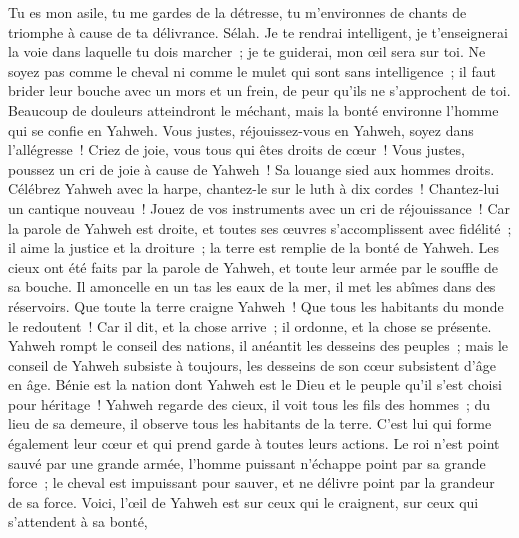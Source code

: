 \begin{multicols}{2}
Tu es mon asile, tu me gardes de la détresse, tu m'environnes de chants de triomphe à cause de ta délivrance. Sélah.
Je te rendrai intelligent, je t'enseignerai la voie dans laquelle tu dois marcher~; je te guiderai, mon œil sera sur toi.
Ne soyez pas comme le cheval ni comme le mulet qui sont sans intelligence~; il faut brider leur bouche avec un mors et un frein, de peur qu'ils ne s'approchent de toi.
Beaucoup de douleurs atteindront le méchant, mais la bonté environne l'homme qui se confie en Yahweh.
Vous justes, réjouissez-vous en Yahweh, soyez dans l'allégresse~! Criez de joie, vous tous qui êtes droits de cœur~!
\VerseOne{}Vous justes, poussez un cri de joie à cause de Yahweh~! Sa louange sied aux hommes droits.
Célébrez Yahweh avec la harpe, chantez-le sur le luth à dix cordes~!
Chantez-lui un cantique nouveau~! Jouez de vos instruments avec un cri de réjouissance~!
Car la parole de Yahweh est droite, et toutes ses œuvres s'accomplissent avec fidélité~;
il aime la justice et la droiture~; la terre est remplie de la bonté de Yahweh.
Les cieux ont été faits par la parole de Yahweh, et toute leur armée par le souffle de sa bouche.
Il amoncelle en un tas les eaux de la mer, il met les abîmes dans des réservoirs.
Que toute la terre craigne Yahweh~! Que tous les habitants du monde le redoutent~!
Car il dit, et la chose arrive~; il ordonne, et la chose se présente.
Yahweh rompt le conseil des nations, il anéantit les desseins des peuples~;
mais le conseil de Yahweh subsiste à toujours, les desseins de son cœur subsistent d'âge en âge.
Bénie est la nation dont Yahweh est le Dieu et le peuple qu'il s'est choisi pour héritage~!
Yahweh regarde des cieux, il voit tous les fils des hommes~;
du lieu de sa demeure, il observe tous les habitants de la terre.
C'est lui qui forme également leur cœur et qui prend garde à toutes leurs actions.
Le roi n'est point sauvé par une grande armée, l'homme puissant n'échappe point par sa grande force~;
le cheval est impuissant pour sauver, et ne délivre point par la grandeur de sa force.
Voici, l'œil de Yahweh est sur ceux qui le craignent, sur ceux qui s'attendent à sa bonté,

\end{multicols}

